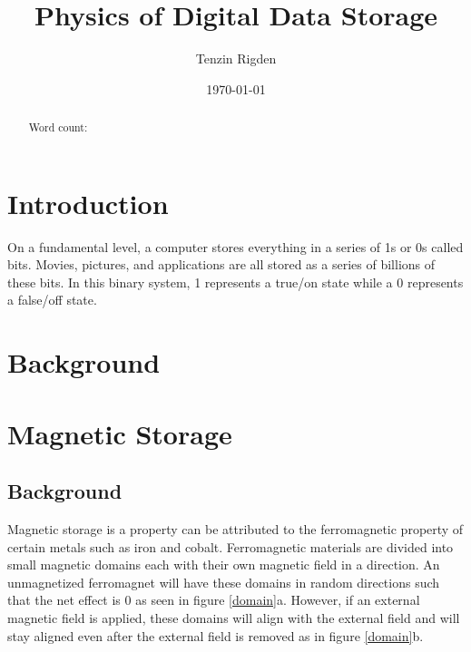 \documentclass[ aip, 12pt]{revtex4-1} %
\begin{document}
\title{Physics of Digital Data Storage}
\author{Tenzin Rigden}
\date{\today}

\begin{abstract}
Word count: 
\end{abstract}

\maketitle
\section{Introduction}
On a fundamental level, a computer stores everything in a series of 1s or 0s called bits. Movies, pictures, and applications are all stored as a series of billions of these bits. In this binary system, 1 represents a true/on state while a 0 represents a false/off state. 
\section{Background}


\section{Magnetic Storage}
\subsection{Background}
Magnetic storage is a property can be attributed to the ferromagnetic property of certain metals such as iron and cobalt. Ferromagnetic materials are divided into small magnetic domains each with their own magnetic field in a direction. An unmagnetized ferromagnet will have these domains in random directions such that the net effect is 0 as seen in figure \ref{domain}a. However, if an external magnetic field is applied, these domains will align with the external field and will stay aligned even after the external field is removed as in figure \ref{domain}b. 
\end{document}
